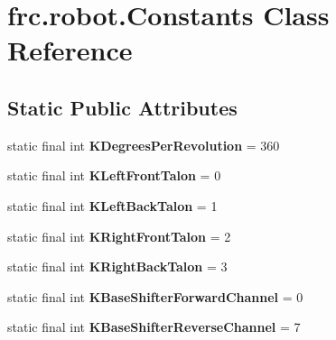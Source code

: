 \hypertarget{classfrc_1_1robot_1_1_constants}{}\section{frc.\+robot.\+Constants Class Reference}
\label{classfrc_1_1robot_1_1_constants}
\subsection*{Static Public Attributes}
\begin{DoxyCompactItemize}
\item 
\mbox{\label{classfrc_1_1robot_1_1_constants_ac9f405f0e61d27851a02eda00708dc4d}} 
static final int {\bfseries K\+Degrees\+Per\+Revolution} = 360
\item 
\mbox{\label{classfrc_1_1robot_1_1_constants_a6f89c9b037dc8dd100dcd0081488afb3}} 
static final int {\bfseries K\+Left\+Front\+Talon} = 0
\item 
\mbox{\label{classfrc_1_1robot_1_1_constants_ac0c92713d00348cb794b960479e5d110}} 
static final int {\bfseries K\+Left\+Back\+Talon} = 1
\item 
\mbox{\label{classfrc_1_1robot_1_1_constants_a1e51f7a9914f1c6a057167e553a5e7a2}} 
static final int {\bfseries K\+Right\+Front\+Talon} = 2
\item 
\mbox{\label{classfrc_1_1robot_1_1_constants_af4286e50d83d45f0b541846d8db23e3a}} 
static final int {\bfseries K\+Right\+Back\+Talon} = 3
\item 
\mbox{\label{classfrc_1_1robot_1_1_constants_a87cca843c6e0b6af6235866ef59cf477}} 
static final int {\bfseries K\+Base\+Shifter\+Forward\+Channel} = 0
\item 
\mbox{\label{classfrc_1_1robot_1_1_constants_af4e34a3570a6313864c3c0075083b74e}} 
static final int {\bfseries K\+Base\+Shifter\+Reverse\+Channel} = 7
\item 
\mbox{\label{classfrc_1_1robot_1_1_constants_a8d814b2f3aa1891a089856181425e655}} 

\end{DoxyCompactItemize}
